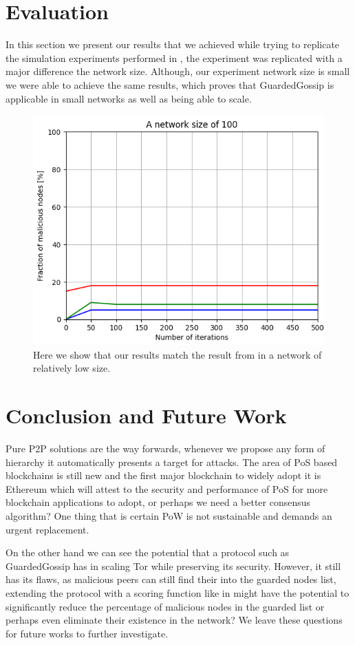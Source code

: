 \documentclass[12pt,twocolumn]{article}
\begin{document}
\section{Evaluation}
In this section we present our results that we achieved while trying to replicate the simulation experiments performed in \cite{guarded_gossip},
the experiment was replicated with a major difference the network size. Although, our experiment network size is small we were able to achieve the same results,
which proves that GuardedGossip is applicable in small networks as well as being able to scale.
\begin{figure}[h]
    \includegraphics[width=\linewidth]{fig/experiment.png}
    \caption{\label{exper} Here we show that our results match the result from \cite{guarded_gossip} in a network of relatively low size.}
\end{figure}
\section{Conclusion and Future Work}
Pure P2P solutions are the way forwards, whenever we propose any form of hierarchy it automatically presents a target for attacks. The area of PoS based
blockchains is still new and the first major blockchain to widely adopt it is Ethereum which will attest to the security and performance of PoS for more 
blockchain applications to adopt, or perhaps we need a better consensus algorithm? One thing that is certain PoW is not sustainable and demands an urgent replacement.

On the other hand we can see the potential that a protocol such as GuardedGossip \cite{guarded_gossip} has in scaling Tor while preserving its security. However, it still has its flaws, 
as malicious peers can still find their into the guarded nodes list, extending the protocol with a scoring function like in \cite{gossip_sub} might have the potential to
significantly reduce the percentage of malicious nodes in the guarded list or perhaps even eliminate their existence in the network? We leave these questions for future works to further investigate.
\printbibliography
\end{document}
